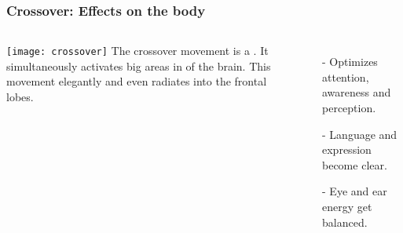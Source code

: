 \documentclass[../main.tex]{subfiles}
\begin{document}
\begin{frame}
\frametitle{Crossover: Effects on the body}

\begin{columns}[c] %
\texttt{[image: crossover]}
The crossover movement is a . It simultaneously activates big areas in  of the brain. This movement elegantly  and even radiates into the frontal lobes. 

	\begin{itemize}
	\item[-] Optimizes attention, awareness and perception.
	\item[-] Language and expression become clear.
	\item[-] Eye and ear energy get balanced.
	\end{itemize}
	

\end{columns}
\end{frame}
\end{document}
